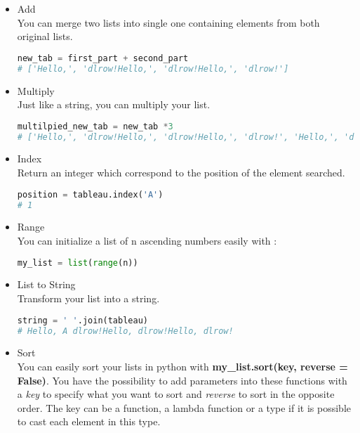 \documentclass[a4paper, 12pt, titlepage]{scrartcl} %
\begin{document}
\begin{itemize}
\item Add \\
You can merge two lists into single one containing elements from both original lists.
\begin{lstlisting}[language=Python]
new_tab = first_part + second_part
# ['Hello,', 'dlrow!Hello,', 'dlrow!Hello,', 'dlrow!']
\end{lstlisting} \vspace{5mm}

\item Multiply \\
Just like a string, you can multiply your list.
\begin{lstlisting}[language=Python]
multilpied_new_tab = new_tab *3
# ['Hello,', 'dlrow!Hello,', 'dlrow!Hello,', 'dlrow!', 'Hello,', 'dlrow!Hello,', 'dlrow!Hello,', 'dlrow!', 'Hello,', 'dlrow!Hello,', 'dlrow!Hello,', 'dlrow!']
\end{lstlisting} \vspace{5mm}

\item Index \\
Return an integer which correspond to the position of the element searched.
\begin{lstlisting}[language=Python]
position = tableau.index('A')
# 1
\end{lstlisting} \vspace{5mm}

\item Range \\
You can initialize a list of n ascending numbers easily with : 
\begin{lstlisting}[language=Python]
my_list = list(range(n))
\end{lstlisting} \vspace{5mm}

\item List to String \\
Transform your list into a string.
\begin{lstlisting}[language=Python]
string = ' '.join(tableau)
# Hello, A dlrow!Hello, dlrow!Hello, dlrow!
\end{lstlisting} \vspace{5mm}

\item Sort \\
\label{Sort}
You can easily sort your lists in python with \textbf{my\_list.sort(key, reverse = False)}. You have the possibility to add parameters into these functions with a \textit{key} to specify what you want to sort and \textit{reverse} to sort in the opposite order. The key can be a function, a lambda function or a type if it is possible to cast each element in this type.


\end{itemize}
\end{document}
